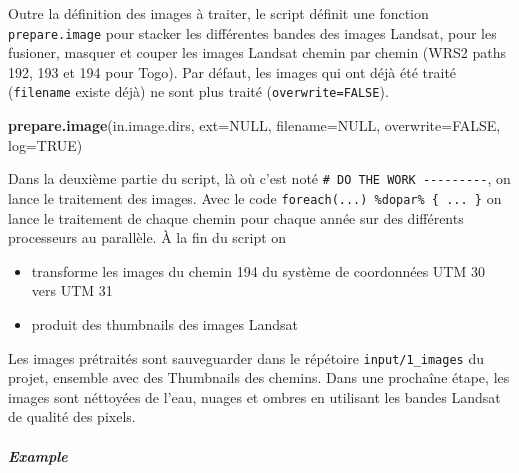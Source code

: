 \documentclass[a4paper, notitlepage, 12pt, krantz2]{krantz}
\newenvironment{Shaded}{\begin{snugshade}}{\end{snugshade}}
\newcommand{\DataTypeTok}[1]{\textcolor[rgb]{0.13,0.29,0.53}{#1}}
\newcommand{\KeywordTok}[1]{\textcolor[rgb]{0.13,0.29,0.53}{\textbf{#1}}}
\newcommand{\NormalTok}[1]{#1}
\newcommand{\OtherTok}[1]{\textcolor[rgb]{0.56,0.35,0.01}{#1}}
\providecommand{\tightlist}{%
  \setlength{\itemsep}{0pt}\setlength{\parskip}{0pt}}
\let\oldsubparagraph\subparagraph
\renewcommand{\subparagraph}[1]{\oldsubparagraph{#1}\mbox{}}
\begin{document}
Outre la définition des images à traiter, le script définit une fonction \texttt{prepare.image} pour stacker les différentes bandes des images Landsat, pour les fusioner, masquer et couper les images Landsat chemin par chemin (WRS2 paths 192, 193 et 194 pour Togo). Par défaut, les images qui ont déjà été traité (\texttt{filename} existe déjà) ne sont plus traité (\texttt{overwrite=FALSE}).

\begin{Shaded}
\begin{Highlighting}[]
\KeywordTok{prepare.image}\NormalTok{(in.image.dirs, }\DataTypeTok{ext=}\OtherTok{NULL}\NormalTok{, }\DataTypeTok{filename=}\OtherTok{NULL}\NormalTok{, }\DataTypeTok{overwrite=}\OtherTok{FALSE}\NormalTok{, }\DataTypeTok{log=}\OtherTok{TRUE}\NormalTok{)}
\end{Highlighting}
\end{Shaded}

Dans la deuxième partie du script, là où c'est noté \texttt{\#\ DO\ THE\ WORK\ -\/-\/-\/-\/-\/-\/-\/-\/-}, on lance le traitement des images. Avec le code \texttt{foreach(...)\ \%dopar\%\ \{\ ...\ \}} on lance le traitement de chaque chemin pour chaque année sur des différents processeurs au parallèle. À la fin du script on

\begin{itemize}
\tightlist
\item
  transforme les images du chemin 194 du système de coordonnées UTM 30 vers UTM 31
\item
  produit des thumbnails des images Landsat
\end{itemize}

Les images prétraités sont sauveguarder dans le répétoire \texttt{input/1\_images} du projet, ensemble avec des Thumbnails des chemins. Dans une prochaîne étape, les images sont néttoyées de l'eau, nuages et ombres en utilisant les bandes Landsat de qualité des pixels.

\hypertarget{example}{%
\subparagraph{Example}\label{example}}
\end{document}
